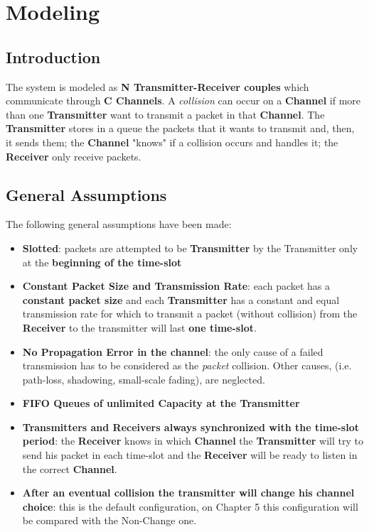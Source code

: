 \section{Modeling}
\subsection{Introduction}
The system is modeled as \textbf{N Transmitter-Receiver couples} which communicate through \textbf{C Channels}. A \textit{collision} can occur on a \textbf{Channel} if more than one \textbf{Transmitter} want to transmit a packet in that \textbf{Channel}. The \textbf{Transmitter} stores in a queue the packets that it wants to transmit and, then, it sends them; the \textbf{Channel} "knows" if a collision occurs and handles it; the \textbf{Receiver} only receive packets.  
\subsection{General Assumptions}
The following general assumptions have been made:
\begin{itemize}
	\item \textbf{Slotted}: packets are attempted to be \textbf{Transmitter} by the Transmitter only at the \textbf{beginning of the time-slot}
	\item \textbf{Constant Packet Size and Transmission Rate}: each packet has a \textbf{constant packet size} and each \textbf{Transmitter} has a constant and equal transmission rate for which to transmit a packet (without collision) from the \textbf{Receiver} to the transmitter will last \textbf{one time-slot}.
	\item \textbf{No Propagation Error in the channel}: the only cause of a failed transmission has to be considered as the \textit{packet} collision. Other causes, (i.e. path-loss, shadowing, small-scale fading), are neglected. 
	\item \textbf{FIFO Queues of unlimited Capacity at the Transmitter} 
	\item \textbf{Transmitters and Receivers always synchronized with the time-slot period}: the \textbf{Receiver} knows in which \textbf{Channel} the \textbf{Transmitter} will try to send his packet in each time-slot and the \textbf{Receiver} will be ready to listen in the correct \textbf{Channel}.
	\item \textbf{After an eventual collision the transmitter will change his channel choice}: this is the default configuration, on Chapter 5 this configuration will be compared with the Non-Change one.
\end{itemize}


